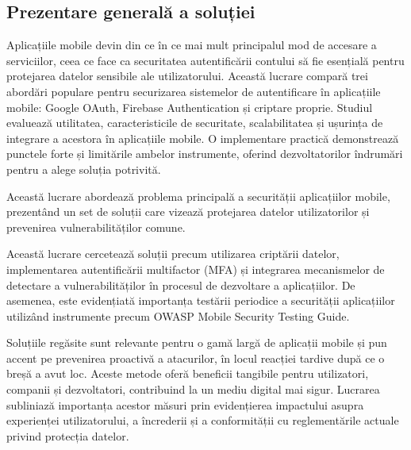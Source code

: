 \documentclass[runningheads]{llncs}
\begin{document}


\subsection{Prezentare generală a soluției}
Aplicațiile mobile devin din ce în ce mai mult principalul mod de accesare a serviciilor, ceea ce face ca securitatea autentificării contului să fie esențială pentru protejarea datelor sensibile ale utilizatorului. Această lucrare compară trei abordări populare pentru securizarea sistemelor de autentificare în aplicațiile mobile: Google OAuth, Firebase Authentication și criptare proprie. Studiul evaluează utilitatea, caracteristicile de securitate, scalabilitatea și ușurința de integrare a acestora în aplicațiile mobile. O implementare practică demonstrează punctele forte și limitările ambelor instrumente, oferind dezvoltatorilor îndrumări pentru a alege soluția potrivită.

Această lucrare abordează problema principală a securității aplicațiilor mobile, prezentând un set de soluții care vizează protejarea datelor utilizatorilor și prevenirea vulnerabilităților comune. 

Această lucrare cercetează soluții precum utilizarea criptării datelor, implementarea autentificării multifactor (MFA) și integrarea mecanismelor de detectare a vulnerabilităților în procesul de dezvoltare a aplicațiilor. De asemenea, este evidențiată importanța testării periodice a securității aplicațiilor utilizând instrumente precum OWASP Mobile Security Testing Guide.

Soluțiile regăsite sunt relevante pentru o gamă largă de aplicații mobile și pun accent pe prevenirea proactivă a atacurilor, în locul reacției tardive după ce o breșă a avut loc. Aceste metode oferă beneficii tangibile pentru utilizatori, companii și dezvoltatori, contribuind la un mediu digital mai sigur. Lucrarea subliniază importanța acestor măsuri prin evidențierea impactului asupra experienței utilizatorului, a încrederii și a conformității cu reglementările actuale privind protecția datelor.
\end{document}
